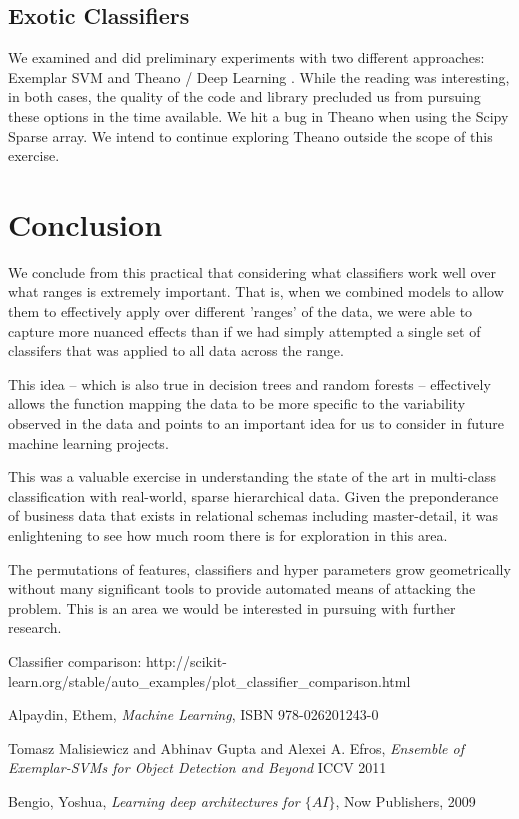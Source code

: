 \documentclass[11pt, oneside]{article}   	%
\begin{document}
\subsection*{Exotic Classifiers}

We examined and did preliminary experiments with two different approaches: Exemplar SVM \cite{exemplar}  and Theano / Deep Learning \cite{deep}. While the reading was interesting, in both cases, the quality of the code and library precluded us from pursuing these options in the time available. We hit a bug in Theano when using the Scipy Sparse array. We intend to continue exploring Theano outside the scope of this exercise.


\section*{Conclusion}

We conclude from this practical that considering what classifiers work well over what ranges is extremely important. That is, when we combined models to allow them to effectively apply over different 'ranges' of the data, we were able to capture more nuanced effects than if we had simply attempted a single set of classifers that was applied to all data across the range. 

This idea -- which is also true in decision trees and random forests -- effectively allows the function mapping the data to be more specific to the variability observed in the data and points to an important idea for us to consider in future machine learning projects.

This was a valuable exercise in understanding the state of the art in multi-class classification with real-world, sparse hierarchical data. Given the preponderance of business data that exists in relational schemas including master-detail, it was enlightening to see how much room there is for exploration in this area.

The permutations of features, classifiers and hyper parameters grow geometrically without many significant tools to provide automated means of attacking the problem. This is an area we would be interested in pursuing with further research.

\begin{thebibliography}{1}

  Classifier comparison:
  http://scikit-learn.org/stable/auto\_examples/plot\_classifier\_comparison.html
  
   Alpaydin, Ethem, \emph{Machine Learning}, ISBN 978-026201243-0

  Tomasz Malisiewicz and Abhinav Gupta and Alexei A. Efros, \emph{Ensemble of Exemplar-SVMs for Object Detection and Beyond} ICCV 2011

  Bengio, Yoshua, \emph{Learning deep architectures for $\{AI\}$}, Now Publishers, 2009

  \end{thebibliography}
\end{document}
